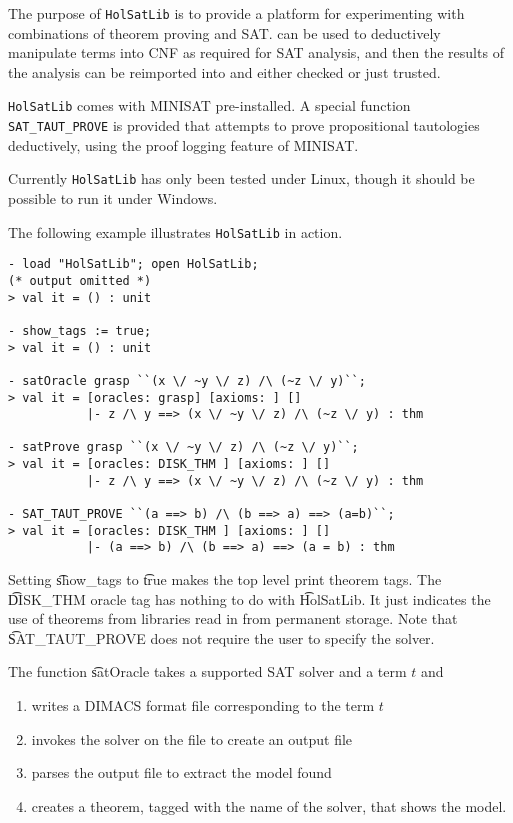 The purpose of {\tt{HolSatLib}} is to provide a platform
for experimenting with combinations of theorem proving and
SAT. \HOL{} can be used to deductively manipulate terms into CNF as
required for SAT analysis, and then the results of the analysis
can be reimported into \HOL{} and either checked or just trusted.

{\tt HolSatLib} comes with MINISAT pre-installed. A special function {\tt SAT\_TAUT\_PROVE} 
is provided that attempts to prove propositional tautologies deductively, using
the proof logging feature of MINISAT.
 
Currently {\tt HolSatLib} has only been tested under Linux, though it should be
possible to run it under Windows.

The following example illustrates {\tt{HolSatLib}} in action.

\begin{session}\begin{verbatim}
- load "HolSatLib"; open HolSatLib;
(* output omitted *)
> val it = () : unit

- show_tags := true;
> val it = () : unit

- satOracle grasp ``(x \/ ~y \/ z) /\ (~z \/ y)``;
> val it = [oracles: grasp] [axioms: ] [] 
           |- z /\ y ==> (x \/ ~y \/ z) /\ (~z \/ y) : thm

- satProve grasp ``(x \/ ~y \/ z) /\ (~z \/ y)``;
> val it = [oracles: DISK_THM ] [axioms: ] [] 
           |- z /\ y ==> (x \/ ~y \/ z) /\ (~z \/ y) : thm

- SAT_TAUT_PROVE ``(a ==> b) /\ (b ==> a) ==> (a=b)``;
> val it = [oracles: DISK_THM ] [axioms: ] [] 
           |- (a ==> b) /\ (b ==> a) ==> (a = b) : thm
\end{verbatim}
\end{session}

Setting \t{show\_tags} to \t{true} makes the \HOL{} top
level print theorem tags. The \t{DISK\_THM} oracle tag has nothing to do with \t{HolSatLib}. It just indicates the use of theorems from \HOL{} libraries read in from permanent storage. Note that \t{SAT\_TAUT\_PROVE} does not require the user to specify the solver.

The function \t{satOracle}  takes a supported SAT solver and a term
$t$ and

\begin{enumerate}
\item writes a DIMACS format file corresponding to the term $t$
\item invokes the solver on the file to create an output file
\item parses the output file to extract the model found
\item creates a theorem, tagged with the name of the solver, that shows the model.
\end{enumerate}


